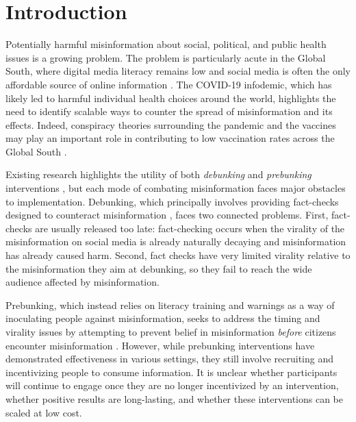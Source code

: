 \section*{Introduction}

Potentially harmful misinformation about social, political, and public health issues is a growing problem. The problem is particularly acute in the Global South, where digital media literacy remains low and social media is often the only affordable source of online information \citep{arechar2022understanding}. The COVID-19 infodemic, which has likely led to harmful individual health choices around the world, highlights the need to identify scalable ways to counter the spread of misinformation and its effects. Indeed, conspiracy theories surrounding the pandemic and the vaccines may play an important role in contributing to low vaccination rates across the Global South %
\citep{mallapaty2022researchers, ackah2022covid}.

Existing research highlights the utility of both \textit{debunking} and \textit{prebunking} interventions \citep{Cooketal2017Inoculation, Nyhanetal2020Literally, walter_meta, guess2020digital, Vragaetal2020}, but each mode of combating misinformation faces major obstacles to implementation. Debunking, which principally involves providing fact-checks designed to counteract misinformation \citep{vanderMeerYan2020Formula, nyhan_reifler_2015}, faces two connected problems. First, fact-checks are usually released too late: fact-checking occurs when the virality of the misinformation on social media is already naturally decaying and misinformation has already caused harm. Second, fact checks have very limited virality relative to the misinformation they aim at debunking, so they fail to reach the wide audience affected by misinformation. 

Prebunking, which instead relies on literacy training and warnings as a way of inoculating people against misinformation, seeks to address the timing and virality issues by attempting to prevent belief in misinformation \textit{before} citizens encounter misinformation \citep{Compton2013Inoculation, mcguire1964some}. However, while prebunking interventions have demonstrated effectiveness in various settings, they still involve recruiting and incentivizing people to consume information. It is unclear whether participants will continue to engage once they are no longer incentivized by an intervention, whether positive results are long-lasting, and whether these interventions can be scaled at low cost.

